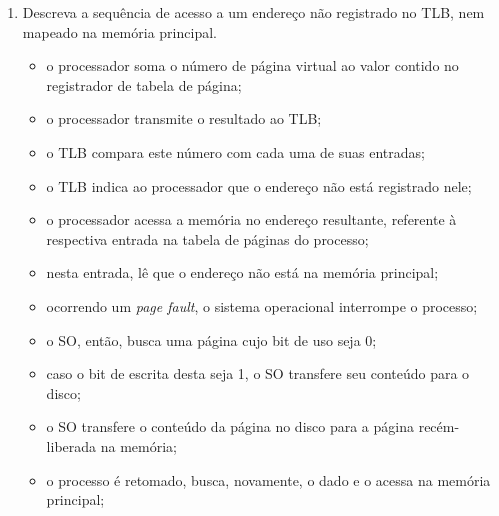 \documentclass{article}
\begin{document}
\begin{enumerate}
\begin{itemize}
    \item o processador soma o número de página virtual ao valor contido no registrador de tabela de página;
    \item o processador transmite o resultado ao TLB;
    \item o TLB compara este número com cada uma de suas entradas;
    \item o TLB indica ao processador que o endereço não está registrado nele;
    \item o processador acessa a memória no endereço resultante, referente à respectiva entrada na tabela de páginas do processo;
    \item nesta entrada, lê que o endereço está na memória principal e extrai o respectivo número de página física;
    \item o processador concatena este número ao offset do endereço e acessa a memória principal no endereço resultante;
\end{itemize}

\item Descreva a sequência de acesso a um endereço não registrado no TLB, nem mapeado na memória principal.

\begin{itemize}
    \item o processador soma o número de página virtual ao valor contido no registrador de tabela de página;
    \item o processador transmite o resultado ao TLB;
    \item o TLB compara este número com cada uma de suas entradas;
    \item o TLB indica ao processador que o endereço não está registrado nele;
    \item o processador acessa a memória no endereço resultante, referente à respectiva entrada na tabela de páginas do processo;
    \item nesta entrada, lê que o endereço não está na memória principal;
    \item ocorrendo um \textit{page fault}, o sistema operacional interrompe o processo;
    \item o SO, então, busca uma página cujo bit de uso seja 0;
    \item caso o bit de escrita desta seja 1, o SO transfere seu conteúdo para o disco;
    \item o SO transfere o conteúdo da página no disco para a página recém-liberada na memória;
    \item o processo é retomado, busca, novamente, o dado e o acessa na memória principal;
\end{itemize}


\end{enumerate}
\end{document}
